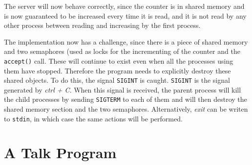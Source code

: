 \documentclass[a4paper]{article}
\begin{document}
The server will now behave correctly, since the counter is in shared memory and is now 
guaranteed to be increased every time it is read, and it is not read by any other process
between reading and increasing by the first process.

The implementation now has a challenge, since there is a piece of shared memory and two
semaphores (used as locks for the incrementing of the counter and the \texttt{accept()}
call. These will continue to exist even when all the processes using them have
stopped. Therefore the program needs to explicitly destroy these shared objects. To do 
this, the signal \texttt{SIGINT} is caught. \texttt{SIGINT} is the signal generated by
\emph{ctrl + C}. When this signal is received, the parent process will kill the child
processes by sending \texttt{SIGTERM} to each of them and will then destroy the shared 
memory section and the two semaphores. Alternatively, \emph{exit} can be writen to 
\texttt{stdin}, in which case the same actions will be performed.

\section{A Talk Program}
\end{document}
